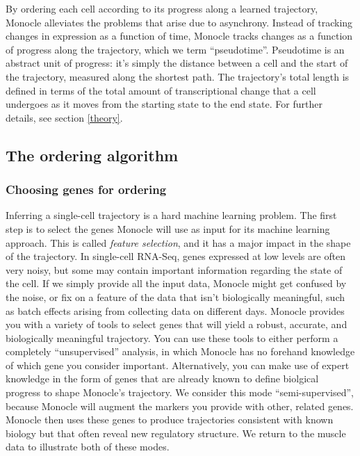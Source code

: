 \documentclass[10pt,oneside]{article}\usepackage[]{graphicx}\usepackage[]{color}
\begin{document}
 By ordering each cell according to its progress along a learned trajectory, Monocle alleviates the problems that arise due to asynchrony. Instead of tracking changes in expression as a function of time, Monocle tracks changes as a function of progress along the trajectory, which we term ``pseudotime''. Pseudotime is an abstract unit of progress: it's simply the distance between a cell and the start of the trajectory, measured along the shortest path. The trajectory's total length is defined in terms of the total amount of transcriptional change that a cell undergoes as it moves from the starting state to the end state. For further details, see section \ref{theory}.
 
 \subsection{The ordering algorithm}
 
 \subsubsection{Choosing genes for ordering}
 Inferring a single-cell trajectory is a hard machine learning problem. The first step is to select the genes Monocle will use as input for its machine learning approach. This is called \emph{feature selection}, and it has a major impact in the shape of the trajectory. In single-cell RNA-Seq, genes expressed at low levels are often very noisy, but some may contain important information regarding the state of the cell.  If we simply provide all the input data, Monocle might get confused by the noise, or fix on a feature of the data that isn't biologically meaningful, such as batch effects arising from collecting data on different days. Monocle provides you with a variety of tools to select genes that will yield a robust, accurate, and biologically meaningful trajectory. You can use these tools to either perform a completely ``unsupervised'' analysis, in which Monocle has no forehand knowledge of which gene you consider important. Alternatively, you can make use of expert knowledge in the form of genes that are already known to define biolgical progress to shape Monocle's trajectory. We consider this mode ``semi-supervised'', because Monocle will augment the markers you provide with other, related genes. Monocle then uses these genes to produce trajectories consistent with known biology but that often reveal new regulatory structure. We return to the muscle data to illustrate both of these modes.
 
\end{document}
